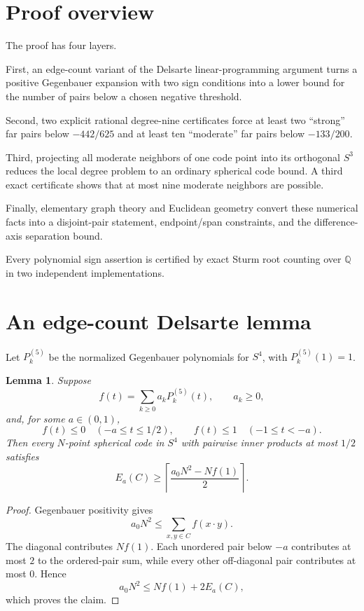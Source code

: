 \documentclass[11pt]{article}
\newtheorem{lemma}{Lemma}
\begin{document}
\section{Proof overview}

The proof has four layers.

First, an edge-count variant of the Delsarte linear-programming argument
turns a positive Gegenbauer expansion with two sign conditions into a lower
bound for the number of pairs below a chosen negative threshold.

Second, two explicit rational degree-nine certificates force at least two
``strong'' far pairs below $-442/625$ and at least ten ``moderate'' far pairs
below $-133/200$.

Third, projecting all moderate neighbors of one code point into its
orthogonal $S^3$ reduces the local degree problem to an ordinary spherical
code bound. A third exact certificate shows that at most nine moderate
neighbors are possible.

Finally, elementary graph theory and Euclidean geometry convert these
numerical facts into a disjoint-pair statement, endpoint/span constraints,
and the difference-axis separation bound.

Every polynomial sign assertion is certified by exact Sturm root counting
over $\mathbb Q$ in two independent implementations.

\section{An edge-count Delsarte lemma}

Let $P_k^{(5)}$ be the normalized Gegenbauer polynomials for $S^4$, with
$P_k^{(5)}(1)=1$.

\begin{lemma}\label{lem:edgecount}
Suppose
\[
f(t)=\sum_{k\ge0}a_kP_k^{(5)}(t),\qquad a_k\ge0,
\]
and, for some $a\in(0,1)$,
\[
f(t)\le0\quad(-a\le t\le1/2),\qquad
f(t)\le1\quad(-1\le t<-a).
\]
Then every $N$-point spherical code in $S^4$ with pairwise inner products at
most $1/2$ satisfies
\[
E_a(C)\ge
\left\lceil\frac{a_0N^2-Nf(1)}2\right\rceil.
\]
\end{lemma}

\begin{proof}
Gegenbauer positivity gives
\[
a_0N^2\le \sum_{x,y\in C}f(x\cdot y).
\]
The diagonal contributes $Nf(1)$. Each unordered pair below $-a$ contributes
at most $2$ to the ordered-pair sum, while every other off-diagonal pair
contributes at most $0$. Hence
\[
a_0N^2\le Nf(1)+2E_a(C),
\]
which proves the claim.
\end{proof}
\end{document}
